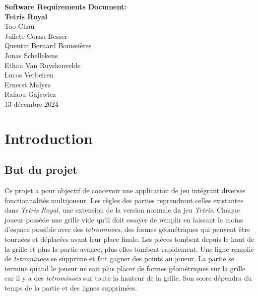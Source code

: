 \documentclass{article}
\begin{document}
\begin{titlepage}
    \centering
    \vspace*{\fill}

    {\Huge \textbf{Software Requirements Document:}\\[0.5cm]
    \textbf{Tetris Royal}} \\[1.5cm]
    
    {\Large Tao Chau\\
    Juliete Cornu-Besser\\
    Quentin Bernard Bouissières\\
    Jonas Schellekens\\
    Ethan Van Ruyskenvelde\\
    Lucas Verbeiren\\
    Ernerst Malysz\\
    Rafaou Gajewicz} \\[2cm]

    {\Large 13 décembre 2024}

    \vspace*{\fill} 
\end{titlepage}

\newpage

\tableofcontents

\newpage

\section{Introduction}

\subsection{But du projet}

\quad Ce projet a pour objectif de concevoir une application de jeu intégrant diverses fonctionnalités multijoueur. Les règles des parties reprendront celles existantes dans \textit{Tetris Royal}, une extension de la version normale du jeu \textit{Tetris}. Chaque joueur possède une grille vide qu'il doit essayer de remplir en laissant le moins d'espace possible avec des \textit{tetrominoes}, des formes géométriques qui peuvent être tournées et déplacées avant leur place finale. Les pièces tombent depuis le haut de la grille et plus la partie avance, plus elles tombent rapidement. Une ligne remplie de  \textit{tetrominoes} se supprime et fait gagner des points au joueur. La partie se termine quand le joueur ne sait plus placer de formes géométriques sur la grille car il y a des \textit{tetrominoes} sur toute la hauteur de la grille. Son score dépendra du temps de la partie et des lignes supprimées.  
\end{document}
